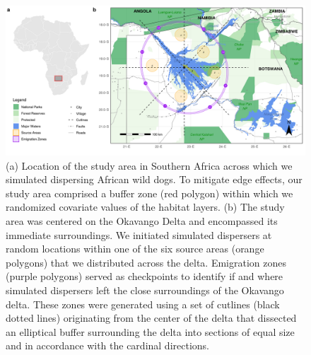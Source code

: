 \documentclass[abstract=on,10pt,a4paper,bibliography=totocnumbered]{article}
\begin{document}
\begin{figure}
 \begin{center}
  \includegraphics[width = \textwidth]{99_StudyArea.png}
  \caption{(a) Location of the study area in Southern Africa across which we
   simulated dispersing African wild dogs. To mitigate edge effects, our study
   area comprised a buffer zone (red polygon) within which we randomized
   covariate values of the habitat layers. (b) The study area was centered on the
   Okavango Delta and encompassed its immediate surroundings. We initiated
   simulated dispersers at random locations within one of the six source areas
   (orange polygons) that we distributed across the delta. Emigration zones
   (purple polygons) served as checkpoints to identify if and where simulated
   dispersers left the close surroundings of the Okavango delta. These zones were
   generated using a set of cutlines (black dotted lines) originating from the
   center of the delta that dissected an elliptical buffer surrounding the delta
   into sections of equal size and in accordance with the cardinal directions.}
  \label{StudyArea}
 \end{center}
\end{figure}
\end{document}

